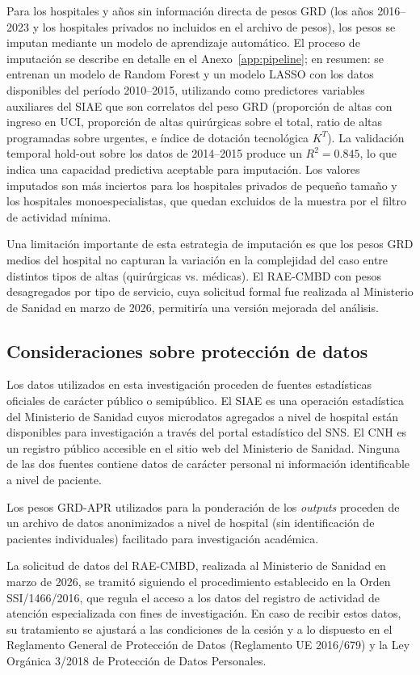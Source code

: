 Para los hospitales y años sin información directa de pesos GRD (los años 2016--2023 y los hospitales privados no incluidos en el archivo de pesos), los pesos se imputan mediante un modelo de aprendizaje automático. El proceso de imputación se describe en detalle en el Anexo~\ref{app:pipeline}; en resumen: se entrenan un modelo de Random Forest y un modelo LASSO con los datos disponibles del período 2010--2015, utilizando como predictores variables auxiliares del SIAE que son correlatos del peso GRD (proporción de altas con ingreso en UCI, proporción de altas quirúrgicas sobre el total, ratio de altas programadas sobre urgentes, e índice de dotación tecnológica $K^T$). La validación temporal hold-out sobre los datos de 2014--2015 produce un $R^2 = 0.845$, lo que indica una capacidad predictiva aceptable para imputación. Los valores imputados son más inciertos para los hospitales privados de pequeño tamaño y los hospitales monoespecialistas, que quedan excluidos de la muestra por el filtro de actividad mínima.

Una limitación importante de esta estrategia de imputación es que los pesos GRD medios del hospital no capturan la variación en la complejidad del caso entre distintos tipos de altas (quirúrgicas vs. médicas). El RAE-CMBD con pesos desagregados por tipo de servicio, cuya solicitud formal fue realizada al Ministerio de Sanidad en marzo de 2026, permitiría una versión mejorada del análisis.

\subsection{Consideraciones sobre protección de datos}

Los datos utilizados en esta investigación proceden de fuentes estadísticas oficiales de carácter público o semipúblico. El SIAE es una operación estadística del Ministerio de Sanidad cuyos microdatos agregados a nivel de hospital están disponibles para investigación a través del portal estadístico del SNS\@. El CNH es un registro público accesible en el sitio web del Ministerio de Sanidad. Ninguna de las dos fuentes contiene datos de carácter personal ni información identificable a nivel de paciente.

Los pesos GRD-APR utilizados para la ponderación de los \textit{outputs} proceden de un archivo de datos anonimizados a nivel de hospital (sin identificación de pacientes individuales) facilitado para investigación académica.

La solicitud de datos del RAE-CMBD, realizada al Ministerio de Sanidad en marzo de 2026, se tramitó siguiendo el procedimiento establecido en la Orden SSI/1466/2016, que regula el acceso a los datos del registro de actividad de atención especializada con fines de investigación. En caso de recibir estos datos, su tratamiento se ajustará a las condiciones de la cesión y a lo dispuesto en el Reglamento General de Protección de Datos (Reglamento UE 2016/679) y la Ley Orgánica 3/2018 de Protección de Datos Personales.

